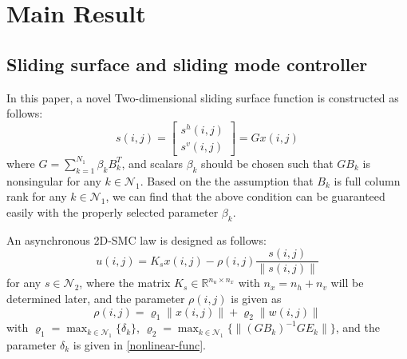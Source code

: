 \documentclass[conference]{IEEEtran}
\begin{document}
\section{Main Result}

\subsection{ Sliding surface and sliding mode controller} \label{sliding-surface}
	In this paper, a novel Two-dimensional sliding surface function is constructed as follows: 
	\begin{equation}\label{siding-surface-equation}	
		s(i,j) = \begin{bmatrix}
					s^{h}(i,j)\\
					s^{v}(i,j)
					\end{bmatrix}
			   = Gx(i,j)
	\end{equation}
	where $G=\sum_{k=1}^{N_{1}}\beta_{k}B^{T}_{k}$, and scalars $\beta_{k}$ should be chosen such that $GB_{k}$ is nonsingular for any $k\in\mathcal{N}_{1}$. Based on the the assumption that $B_{k}$ is full column rank for any $k\in\mathcal{N}_{1}$, we can find that the above condition can be guaranteed easily with the properly selected parameter $\beta_{k}$. 
 	
 	An asynchronous 2D-SMC law is designed as follows:
	\begin{equation}\label{smc-law}
		u(i,j) = K_{s}x(i,j)-\rho(i,j)\frac{s(i,j)}{\|s(i,j)\|}
	\end{equation}
	for any $s\in\mathcal{N}_{2}$, where the matrix $K_{s}\in\mathbb{R}^{n_u\times n_x}$ with $n_x=n_h+n_v$ will be determined later, and the parameter $\rho(i,j)$ is given as
	\begin{equation}\label{varrho}
	\rho(i,j) = \varrho_{1}\|x(i,j)\| + \varrho_{2}\|w(i,j)\|
	\end{equation}
	with $\varrho_{1}=\max_{k\in\mathcal{N}_{1}} \{\delta_{k} \}$, $\varrho_{2} = \max_{k\in\mathcal{N}_{1}}\{\|(GB_{k})^{-1}GE_{k}\| \} $, and the parameter $\delta_{k}$ is given in \eqref{nonlinear-func}. 
	
\end{document}
